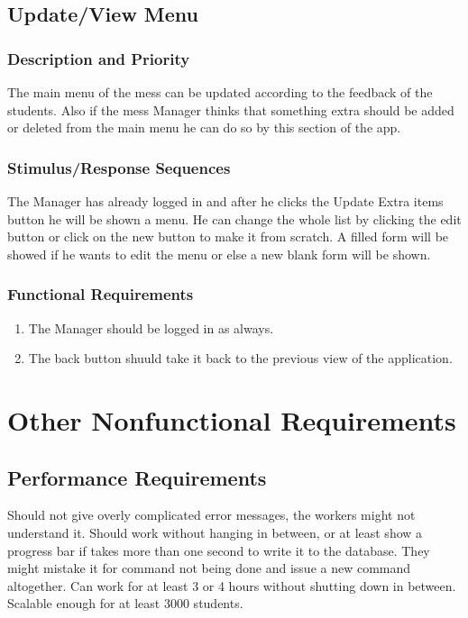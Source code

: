 \documentclass{scrreprt}
\begin{document}
\section{Update/View Menu}

\subsection{Description and Priority}
The main menu of the mess can be updated according to the feedback of the students. Also if the mess Manager thinks that something extra should be added or deleted from the main menu he can do so by this section of the app.

\subsection{Stimulus/Response Sequences}
The Manager has already logged in and after he clicks the Update Extra items button he will be shown a menu. He can change the whole list by clicking the edit button or click on the new button to make it from scratch. A filled form will be showed if he wants to edit the menu or else a new blank form will be shown.

\subsection{Functional Requirements}
\begin{enumerate}
    \item The Manager should be logged in as always.
    \item The back button shuuld take it back to the previous view of the application.
\end{enumerate}



\chapter{Other Nonfunctional Requirements}

\section{Performance Requirements}
Should not give overly complicated error messages, the workers might not understand it.
Should work without hanging in between, or at least show a progress bar if takes more than one second to write it to the database.
They might mistake it for command not being done and issue a new command altogether.
Can work for at least 3 or 4 hours without shutting down in between.
Scalable enough for at least 3000 students.
\end{document}
